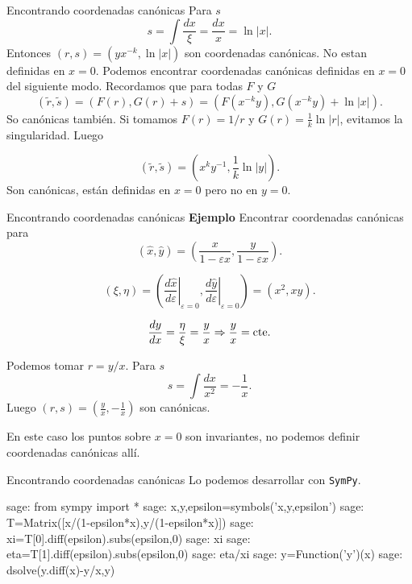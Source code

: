\documentclass[handout,hyperref={colorlinks=true}]{beamer}
\renewcommand{\epsilon}{\varepsilon}
\begin{document}
\begin{frame}{Encontrando coordenadas canónicas}\label{pag_ejem_canon2}
 Para $s$
\[s=\int\frac{dx}{\xi}=\frac{dx}{x}=\ln|x|.\]
Entonces $(r,s)=(yx^{-k},\ln|x|)$ son coordenadas canónicas. No estan definidas en $x=0$.
Podemos encontrar coordenadas canónicas definidas en $x=0$ del siguiente modo. Recordamos que para todas $F$ y $G$
\[(\tilde{r},\tilde{s})=(F(r),G(r)+s)=(F(x^{-k}y),G(x^{-k}y)+\ln|x|).\]
So canónicas también. Si tomamos $F(r)=1/r$ y $G(r)=\frac{1}{k}\ln|r|$, evitamos la singularidad. Luego

\[(\tilde{r},\tilde{s})=(x^ky^{-1},\frac{1}{k}\ln|y|).\]
Son canónicas, están definidas en $x=0$ pero no en $y=0$.  






\end{frame}


\begin{frame}{Encontrando coordenadas canónicas}\label{pag:can_ejem_p}
\textbf{Ejemplo} Encontrar coordenadas canónicas para
\[(\hat{x},\hat{y})=\left( \frac{x}{1-\epsilon x},\frac{y}{1-\epsilon x}\right).\]

\[(\xi,\eta)=\left(\left.\frac{d\hat{x}}{d\epsilon}\right|_{\epsilon=0},\left.\frac{d\hat{y}}{d\epsilon}\right|_{\epsilon=0}\right)=(x^2,xy).\]

\[\frac{dy}{dx}=\frac{\eta}{\xi}=\frac{y}{x}\Rightarrow \frac{y}{x}=\hbox{cte}.\]

Podemos tomar $r=y/x$. Para $s$
\[s=\int\frac{dx}{x^2}=-\frac{1}{x}.\]
Luego $(r,s)=(\frac{y}{x},-\frac{1}{x})$ son canónicas.



En este caso los puntos sobre $x=0$ son invariantes, no podemos definir coordenadas canónicas allí.


 
\end{frame}



\begin{frame}[fragile]{Encontrando coordenadas canónicas}
Lo podemos desarrollar con \texttt{SymPy}. 
\begin{sagecommandline}
sage: from sympy import *
sage: x,y,epsilon=symbols('x,y,epsilon')
sage: T=Matrix([x/(1-epsilon*x),y/(1-epsilon*x)])
sage: xi=T[0].diff(epsilon).subs(epsilon,0)
sage: xi
sage: eta=T[1].diff(epsilon).subs(epsilon,0)
sage: eta/xi
sage: y=Function('y')(x)
sage: dsolve(y.diff(x)-y/x,y)


\end{sagecommandline}
\end{frame}
\end{document}
